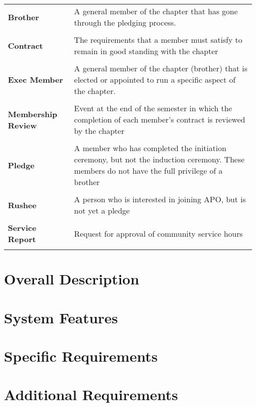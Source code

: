 \documentclass{article}
\begin{document}
\begin{longtable}{lp{8cm}}

{\bf Brother} & A general member of the chapter that has gone through
the pledging process. \\ \\
{\bf Contract} & The requirements that a member must satisfy to remain
in good standing with the chapter \\ \\
{\bf Exec Member} & A general member of the chapter (brother) that is
elected or appointed to run a specific aspect of the chapter. \\ \\
{\bf Membership Review} & Event at the end of the semester in which
the completion of each member's contract is reviewed by the chapter\\ \\
{\bf Pledge} & A member who has completed the initiation ceremony, but
not the induction ceremony. These members do not have the full
privilege of a brother\\ \\
{\bf Rushee} & A person who is interested in joining APO, but is not
yet a pledge \\ \\
{\bf Service Report} & Request for approval of community service hours
\\ \\

\end{longtable}


\section{Overall Description}

\section{System Features}

\section{Specific Requirements}

\section{Additional Requirements}
\end{document}
